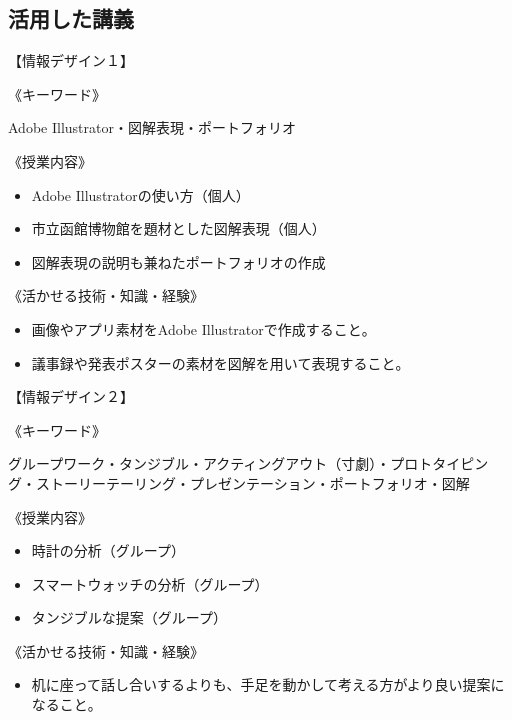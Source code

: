 \documentclass[openany,11pt,papersize]{jsbook}
\begin{document}
\begin{appendix}
\chapter{活用した講義}
\par【情報デザイン１】
\par《キーワード》
\par Adobe Illustrator・図解表現・ポートフォリオ
\par《授業内容》
\begin{itemize}
\item Adobe Illustratorの使い方（個人）
\item 市立函館博物館を題材とした図解表現（個人）
\item 図解表現の説明も兼ねたポートフォリオの作成
\end{itemize}
\par《活かせる技術・知識・経験》
\begin{itemize}
\item 画像やアプリ素材をAdobe Illustratorで作成すること。
\item 議事録や発表ポスターの素材を図解を用いて表現すること。
\end{itemize}

\par【情報デザイン２】
\par《キーワード》
\par グループワーク・タンジブル・アクティングアウト（寸劇）・プロトタイピング・ストーリーテーリング・プレゼンテーション・ポートフォリオ・図解
\par《授業内容》
\begin{itemize}
\item 時計の分析（グループ）
\item スマートウォッチの分析（グループ）
\item タンジブルな提案（グループ）
\end{itemize}
\par《活かせる技術・知識・経験》
\begin{itemize}
\item 机に座って話し合いするよりも、手足を動かして考える方がより良い提案になること。
\end{itemize}


\end{appendix}
\end{document}
